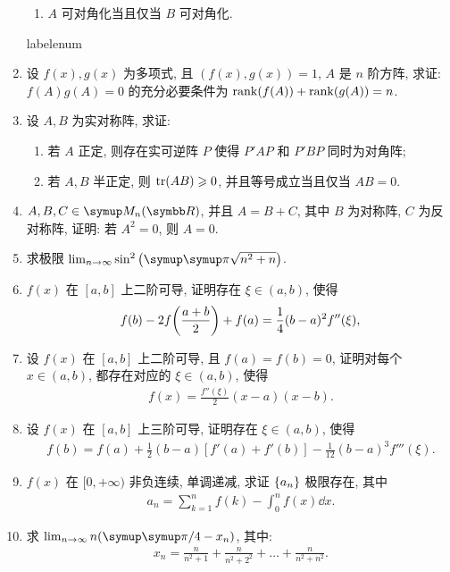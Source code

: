 \documentclass{ctexart}
\makeatletter
\let\umathpi\pi
\renewcommand\pi{\symup\umathpi}%
\let\set\qty
\let\ge\geqslant
\def\asteriskitem{*}
\def\sitem{%
  \expandafter\let\expandafter\originallabel\csname labelenum\romannumeral\@enumdepth\endcsname
  \expandafter\def\csname labelenum\romannumeral\@enumdepth\expandafter\endcsname\expandafter{%
    \expandafter\bfseries\expandafter\color{red}\expandafter{\expandafter\asteriskitem\expandafter\originallabel}}%
  \item
  \expandafter\let\csname labelenum\romannumeral\@enumdepth\endcsname\originallabel
}
\newcommand{\limit}[2]{\lim_{#1 \to #2}}
\makeatother
\begin{document}
\begin{enumerate}[series=exer]
\begin{enumerate}
        \item $ A $ 可对角化当且仅当 $ B $ 可对角化.
    \end{enumerate}
    \sitem 设 $ f(x), g(x) $ 为多项式, 且 $ (f(x), g(x)) = 1 $, $ A $ 是 $ n $ 阶方阵, 求证: $ f(A)g(A) = 0 $ 的充分必要条件为 $ \rank(f(A)) + \rank(g(A)) = n $.
    \item 设 $ A, B $ 为实对称阵, 求证:
    \begin{enumerate}
        \item 若 $ A $ 正定, 则存在实可逆阵 $ P $ 使得 $ P'AP $ 和 $ P'BP $ 同时为对角阵;
        \item 若 $ A, B $ 半正定, 则 $ \tr(AB) \ge 0 $, 并且等号成立当且仅当 $ AB = 0 $.
    \end{enumerate}
    \item $ A, B, C \in \MM $, 并且 $ A = B + C $, 其中 $ B $ 为对称阵, $ C $ 为反对称阵, 证明: 若 $ A^{2} = 0 $, 则 $ A = 0 $.
    \item 求极限 $ \limit{n}{\infty} \sin^{2}\qty(\pi \sqrt{n^{2} + n}) $.  
    \item $ f(x) $ 在 $ [a, b] $ 上二阶可导, 证明存在 $ \xi \in (a, b) $, 使得
    \begin{align*}
        f(b) - 2f\qty(\frac{a + b}{2}) + f(a) = \frac{1}{4} (b - a)^{2} f''(\xi),
    \end{align*}
    \item 设 $ f(x) $ 在 $ [a, b] $ 上二阶可导, 且 $ f(a) = f(b)  = 0 $, 证明对每个 $ x \in (a, b) $, 都存在对应的 $ \xi \in (a, b) $, 使得
    \begin{align*}
        f(x) = \frac{f''(\xi)}{2} (x - a) (x - b).
    \end{align*}
    \item 设 $ f(x) $ 在 $ [a, b] $ 上三阶可导, 证明存在 $ \xi \in (a, b) $, 使得
    \begin{align*}
        f(b) = f(a) + \frac{1}{2} (b - a) [f'(a) + f'(b)] - \frac{1}{12} (b - a)^{3} f'''(\xi).
    \end{align*}
    \item $ f(x) $ 在 $ [0, +\infty) $ 非负连续, 单调递减, 求证 $ \set{a_{n}} $ 极限存在, 其中
    \begin{align*}
        a_{n} = \sum_{k = 1}^{n} f(k) - \int_{0}^{n} f(x) \dd{x}.
    \end{align*}
    \item 求 $ \limit{n}{\infty} n \qty(\pi/4 - x_{n}) $, 其中:
    \begin{align*}
        x_{n} = \frac{n}{n^{2} + 1} + \frac{n}{n^{2} + 2^{2}} + \dots + \frac{n}{n^{2} + n^{2}}.

\end{align*}
\end{enumerate}
\end{document}
